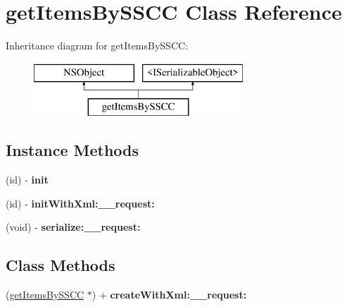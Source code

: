 \hypertarget{interfaceget_items_by_s_s_c_c}{}\section{get\+Items\+By\+S\+S\+C\+C Class Reference}
\label{interfaceget_items_by_s_s_c_c}
Inheritance diagram for get\+Items\+By\+S\+S\+C\+C\+:\begin{figure}[H]
\begin{center}
\leavevmode
\includegraphics[height=2.000000cm]{interfaceget_items_by_s_s_c_c}
\end{center}
\end{figure}
\subsection*{Instance Methods}
\begin{DoxyCompactItemize}
\item 
\hypertarget{interfaceget_items_by_s_s_c_c_a5045a79da22ec3c17fc7800d9f521b00}{}(id) -\/ {\bfseries init}\label{interfaceget_items_by_s_s_c_c_a5045a79da22ec3c17fc7800d9f521b00}

\item 
\hypertarget{interfaceget_items_by_s_s_c_c_a1ba425db7c401e59f62c7e7b719aafa5}{}(id) -\/ {\bfseries init\+With\+Xml\+:\+\_\+\+\_\+request\+:}\label{interfaceget_items_by_s_s_c_c_a1ba425db7c401e59f62c7e7b719aafa5}

\item 
\hypertarget{interfaceget_items_by_s_s_c_c_ac7d098b9cbb06cca11e86096aa062885}{}(void) -\/ {\bfseries serialize\+:\+\_\+\+\_\+request\+:}\label{interfaceget_items_by_s_s_c_c_ac7d098b9cbb06cca11e86096aa062885}

\end{DoxyCompactItemize}
\subsection*{Class Methods}
\begin{DoxyCompactItemize}
\item 
\hypertarget{interfaceget_items_by_s_s_c_c_a03dc2111e8ef59ef8c09d54d723cede0}{}(\hyperlink{interfaceget_items_by_s_s_c_c}{get\+Items\+By\+S\+S\+C\+C} $\ast$) + {\bfseries create\+With\+Xml\+:\+\_\+\+\_\+request\+:}\label{interfaceget_items_by_s_s_c_c_a03dc2111e8ef59ef8c09d54d723cede0}

\end{DoxyCompactItemize}
